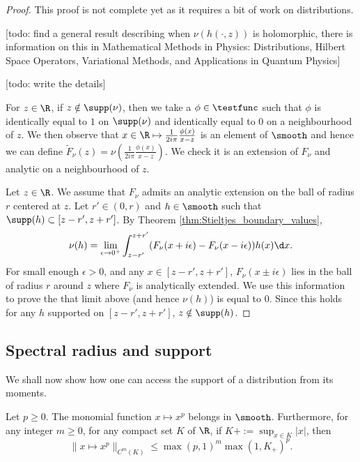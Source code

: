 \begin{proof}
  This proof is not complete yet as it requires a bit of work on distributions.

  [todo: find a general result describing when $\nu(h(\cdot, z))$ is holomorphic, there is
  information on this in Mathematical Methods in Physics: Distributions, Hilbert Space Operators,
  Variational Methods, and Applications in Quantum Physics]

  [todo: write the details]

  For $z \in \R$, if $z \notin \supp(\nu)$, then we take a
  $\phi \in \testfunc$ such that $\phi$ is identically equal to $1$ on $\supp (\nu)$
  and identically equal to $0$ on a neighbourhood of $z$.
  We then observe that $x \in \R \mapsto  \frac{1}{2 i \pi} \frac{\phi(x)}{x-z}$
  is an element of $\smooth$ and hence we can
  define $\tilde{F}_\nu(z) = \nu(\frac{1}{2 i \pi} \frac{\phi(x)}{x-z})$.
  We check it is an extension of $F_\nu$ and analytic on a neighbourhood of $z$.

  Let $z \in \R$. We assume that $F_\nu$ admits an analytic extension on the ball of radius $r$
  centered at $z$.
  Let $r' \in (0,r)$ and
  $h \in \smooth$ such that $\supp(h) \subset [z-r',z+r']$.
  By Theorem \ref{thm:Stieltjes_boundary_values},
  \begin{equation*}
    \nu(h) = \lim_{\epsilon \rightarrow 0^+}
    \int_{z-r'}^{z+r'} (F_\nu(x+i \epsilon) - F_\nu(x - i \epsilon)) h(x) \d x.
  \end{equation*}
  For small enough $\epsilon>0$, and any $x \in [z-r',z+r']$,
  $F_\nu(x \pm i \epsilon)$ lies in the ball of radius $r$ around $z$ where $F_\nu$
  is analytically extended. We use this information to prove the that limit above (and hence
  $\nu(h)$) is equal to $0$. Since this holds for any $h$ supported on $[z-r',z+r']$,
  $z \notin \supp(h)$.
\end{proof}

\subsection{Spectral radius and support}

We shall now show how one can access the support of a distribution
from its moments.

\begin{lemma}
  \label{lem:monomial_smooth}
  Let $p \geq 0$.
  The monomial function $x \mapsto x^p$ belongs in $\smooth$. Furthermore,
  for any integer $m \geq 0$, for any compact set $K$ of $\R$,
  if $K+ := \sup_{x \in K} |x|$, then
  \begin{equation*}
    \|x \mapsto x^p\|_{C^m(K)}
    \leq \max(p,1)^m \max (1, K_+)^p.
  \end{equation*}
\end{lemma}

